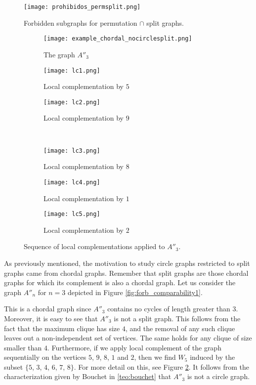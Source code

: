 \documentclass[12pt]{book}
\theoremstyle{plain}
\theoremstyle{remark}
\begin{document}
\begin{figure}[h]
\centering
\texttt{[image: prohibidos\_permsplit.png]}
\caption{Forbidden subgraphs for permutation $\cap$ split graphs.%
} \label{fig:forb_permsplit_base}
\end{figure} 

\begin{figure}[h]
\centering
\begin{subfigure}{.328\textwidth}
\centering
\texttt{[image: example\_chordal\_nocirclesplit.png]}
\caption{The graph $A''_3$}
\end{subfigure}
\begin{subfigure}{.328\textwidth}
\centering
\texttt{[image: lc1.png]}
\caption{Local complementation by $5$}
\end{subfigure}
\begin{subfigure}{.328\textwidth}
\centering
\texttt{[image: lc2.png]}
\caption{Local complementation by $9$}
\end{subfigure} \\
\begin{subfigure}{.327\textwidth}
\centering
\texttt{[image: lc3.png]}
\caption{Local complementation by $8$}
\end{subfigure} 
\begin{subfigure}{.327\textwidth}
\centering
\texttt{[image: lc4.png]}
\caption{Local complementation by $1$}
\end{subfigure} 
\begin{subfigure}{.327\textwidth}
\centering
\texttt{[image: lc5.png]}
\caption{Local complementation by $2$}
\end{subfigure}
\caption{Sequence of local complementations applied to $A''_3$.} \label{fig:local_complement_A''3}
\end{figure} 

As previously mentioned, the motivation to study circle graphs restricted to split graphs came from chordal graphs. Remember that split graphs are those chordal graphs for which its complement is also a chordal graph.
Let us consider the graph $A''_n$ for $n = 3$ depicted in Figure \ref{fig:forb_comparability1}. %

This is a chordal graph since $A''_3$ contains no cycles of length greater than $3$. Moreover, it is easy to see that $A''_3$ is not a split graph. This follows from the fact that the maximum clique has size $4$, and the removal of any such clique leaves out a non-independent set of vertices. The same holds for any clique of size smaller than $4$. 
Furthermore, if we apply local complement of the graph sequentially on the vertices $5$, $9$, $8$, $1$ and $2$, then we find $W_5$ induced by the subset $\{ 5$, $3$, $4$, $6$, $7$, $8 \}$. For more detail on this, see Figure \ref{fig:local_complement_A''3}. It follows from the characterization given by Bouchet in \ref{teo:bouchet} that $A''_3$ is not a circle graph. 
\end{document}

